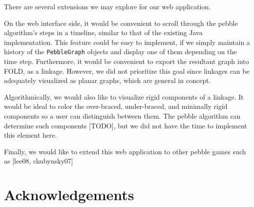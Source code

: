 \documentclass[aps,prd,final,twocolumn,letterpaper,nofootinbib]{revtex4-1}
\begin{document}
There are several extensions we may explore for our web application.

On the web interface side,
it would be convenient to scroll through the pebble algorithm's steps
in a timeline, similar to that of the existing Java implementation.
This feature could be easy to implement,
if we simply maintain a history of the \texttt{PebbleGraph} objects
and display one of them depending on the time step.
Furthermore, it would be convenient to export the resultant graph into FOLD,
as a linkage. However, we did not prioritize this goal since
linkages can be adequately visualized as planar graphs,
which are general in concept.

Algorithmically, we would also like to visualize rigid components of a linkage.
It would be ideal to color the over-braced,
under-braced, and minimally rigid components so a user
can distinguish between them.
The pebble algorithm can determine such components [TODO],
but we did not have the time to implement this element here.

Finally, we would like to extend this web application to other pebble games
such as [lee08, chubynsky07]


\section*{Acknowledgements}


{}

\end{document}
